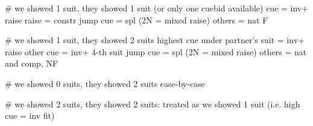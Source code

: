 # we showed 1 suit, they showed 1 suit (or only one cuebid available)
cue = inv+ raise
raise = constr
jump cue = spl
(2N = mixed raise)
others = nat F

# we showed 1 suit, they showed 2 suits
highest cue under partner's suit = inv+ raise
other cue = inv+ 4-th suit
jump cue = spl
(2N = mixed raise)
others = nat and comp, NF

# we showed 0 suits, they showed 2 suits
case-by-case

# we showed 2 suits, they showed 2 suits: 
treated as we showed 1 suit (i.e. high cue = inv fit)